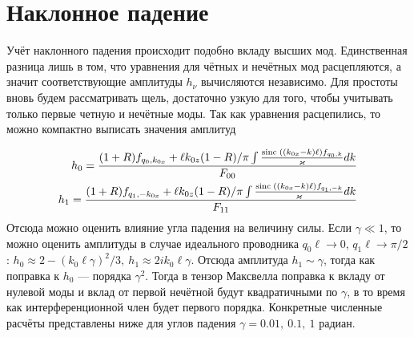 \section{Наклонное падение}

Учёт наклонного падения происходит подобно вкладу высших мод. Единственная разница лишь в том, что уравнения для чётных и нечётных мод расцепляются, а значит соответствующие амплитуды $h_\nu$ вычисляются независимо. Для простоты вновь будем рассматривать щель, достаточно узкую  для того, чтобы учитывать только первые четную и нечётные моды. Так как уравнения расцепились, то можно компактно выписать значения амплитуд

\begin{eqnarray}
  h_0 = \frac{(1+R)f_{q_0,k_{0x}} + \ell k_{0z}(1-R)/\pi \int \frac{\mathrm{sinc}\;((k_{0x}-k)\ell) f_{q_0,k} }{\varkappa} dk }{F_{00} } \\
  h_1 = \frac{(1+R)f_{q_1,-k_{0x}} + \ell k_{0z}(1-R)/\pi \int \frac{\mathrm{sinc}\;((k_{0x}-k)\ell) f_{q_1,-k} }{\varkappa} dk }{F_{11}}
\end{eqnarray}
Отсюда можно оценить влияние угла падения на величину силы. Если $\gamma\ll 1$, то можно оценить амплитуды в случае идеального проводника $q_0 \ell \to 0$, $q_1 \ell \to \pi/2$:
$h_0 \approx 2-(k_0\ell \gamma)^2/3,~h_1 \approx  2 i  k_0\ell \gamma$. Отсюда амплитуда $h_1\sim \gamma$, тогда как поправка к $h_0$ --- порядка $\gamma^2$. Тогда в тензор Максвелла поправка к вкладу от нулевой моды и вклад от первой нечётной будут квадратичными по $\gamma$, в то время как интерференционной член будет первого порядка. 
Конкретные численные расчёты представлены ниже для углов падения $\gamma = 0.01,\ 0.1,\ 1$ радиан.
